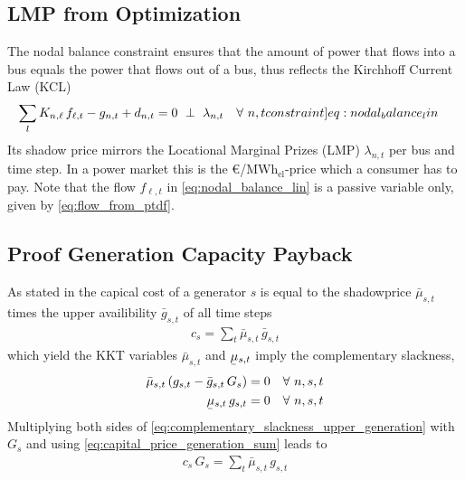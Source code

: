 \documentclass[11pt,twocolumn]{article}
\newcommand{\ubar}[1]{\underaccent{\bar}{#1}}
\newcommand{\resultsin}[1]{\hspace{6pt} \bot  \hspace{6pt} #1}
\newcommand{\Forall}[1]{\hspace{10pt} \forall \,\, #1 }
\newcommand{\generation}{g_{s,t}}
\newcommand{\generationpotential}{\bar{g}_{s,t}}
\newcommand{\nodalgeneration}[1][n]{g_{#1,t}}
\newcommand{\capacityGeneration}{G_{s}}
\newcommand{\capexGeneration}{c_{s}}
\newcommand{\nodaldemand}[1][n]{d_{#1,t}}
\newcommand{\incidence}[1][n]{K_{#1,\ell}}
\newcommand{\mulowergeneration}{\ubar{\mu}_{s,t}}
\newcommand{\muuppergeneration}{\bar{\mu}_{s,t}}
\newcommand{\lmp}[1][n]{\lambda_{#1,t}}
\newcommand{\flow}{f_{\ell,t}}
\newcommand{\megawatthour}{MWh$_\text{el}$}
\begin{document}
\subsection{LMP from Optimization}
The nodal balance constraint ensures that the amount of power that flows into a bus equals the power that flows out of a bus, thus reflects the Kirchhoff Current Law (KCL)
\begin{align}
    \sum_l \incidence \, \flow  - \nodalgeneration + \nodaldemand &= 0 \resultsin{\lmp} \Forall{n,t}
    \label[constraint]{eq:nodal_balance_lin}
\end{align}
Its shadow price mirrors the Locational Marginal Prizes (LMP) $\lmp$ per bus and time step. In a power market this is the \euro/\megawatthour-price which a consumer has to pay. Note that the flow $\flow$ in \cref{eq:nodal_balance_lin} is a passive variable only, given by \cref{eq:flow_from_ptdf}.\\


\subsection{Proof Generation Capacity Payback}

As stated in \cite{brown_decreasing_2020} the capical cost of a generator $s$ is equal to the shadowprice $\muuppergeneration$ times the upper availibility $\generationpotential$ of all time steps 
\begin{align}
 \capexGeneration  = \sum_t \muuppergeneration \, \generationpotential 
 \label{eq:capital_price_generation_sum}
\end{align}
 which yield the KKT variables $\muuppergeneration$ and $\mulowergeneration$ imply the complementary slackness,
\begin{align}
\muuppergeneration \left( \generation - \generationpotential \, \capacityGeneration \right)  &= 0  \Forall{n,s,t} 
\label{eq:complementary_slackness_upper_generation} \\
\mulowergeneration  \, \generation &= 0 \Forall{n,s,t}
\label{eq:complementary_slackness_lower_generation} 
\end{align}
Multiplying both sides of \cref{eq:complementary_slackness_upper_generation} with $\capacityGeneration$ and using \cref{eq:capital_price_generation_sum} leads to 
\begin{align}
 \capexGeneration \, \capacityGeneration  = \sum_t \muuppergeneration \, \generation 
 \label{eq:capital_price_generation_sum}
\end{align}
\end{document}
